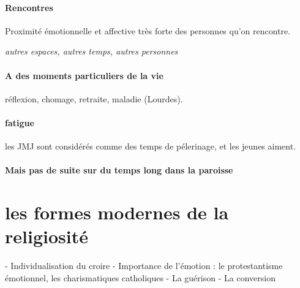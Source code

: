 \paragraph{Rencontres} Proximité émotionnelle et affective très forte des personnes qu'on rencontre. 

\textit{autres espaces, autres temps, autres personnes}

\paragraph{A des moments particuliers de la vie} réflexion, chomage, retraite, maladie (Lourdes).

\paragraph{fatigue} les JMJ sont considérés comme des temps de pélerinage, et les jeunes aiment. 

\paragraph{Mais pas de suite sur du temps long dans la paroisse}





\section{les formes modernes de la religiosité }
- Individualisation du croire
- Importance de l’émotion : le protestantisme émotionnel, les charismatiques catholiques
- La guérison
- La conversion

